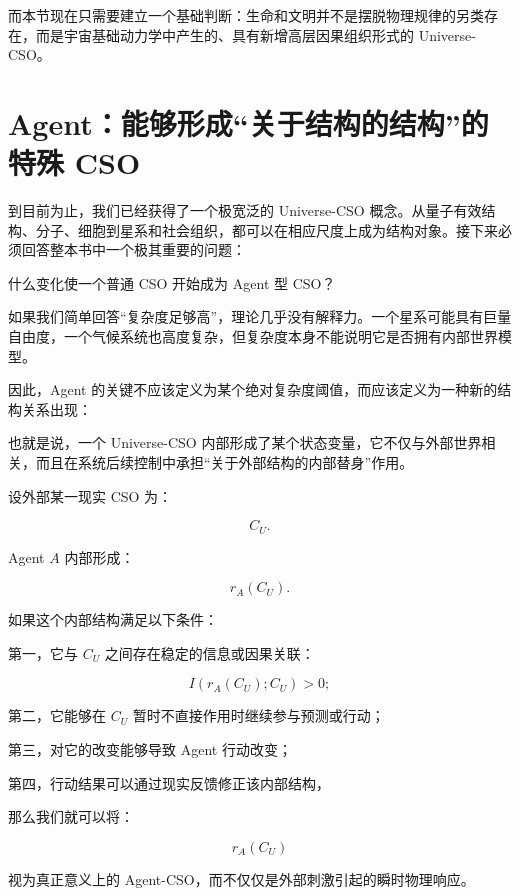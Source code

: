 而本节现在只需要建立一个基础判断：生命和文明并不是摆脱物理规律的另类存在，而是宇宙基础动力学中产生的、具有新增高层因果组织形式的 Universe-CSO。

\section{Agent：能够形成“关于结构的结构”的特殊 CSO}

到目前为止，我们已经获得了一个极宽泛的 Universe-CSO 概念。从量子有效结构、分子、细胞到星系和社会组织，都可以在相应尺度上成为结构对象。接下来必须回答整本书中一个极其重要的问题：

\begin{statementbox}
什么变化使一个普通 CSO 开始成为 Agent 型 CSO？
\end{statementbox}

如果我们简单回答“复杂度足够高”，理论几乎没有解释力。一个星系可能具有巨量自由度，一个气候系统也高度复杂，但复杂度本身不能说明它是否拥有内部世界模型。

因此，Agent 的关键不应该定义为某个绝对复杂度阈值，而应该定义为一种新的结构关系出现：

\begin{statementbox}
\centering
{}
\end{statementbox}

也就是说，一个 Universe-CSO 内部形成了某个状态变量，它不仅与外部世界相关，而且在系统后续控制中承担“关于外部结构的内部替身”作用。

设外部某一现实 CSO 为：

\[
C_U.
\]

Agent $A$ 内部形成：

\[
r_A(C_U).
\]

如果这个内部结构满足以下条件：

第一，它与 $C_U$ 之间存在稳定的信息或因果关联：

\[
I
\left(
r_A(C_U);
C_U
\right)
>
0;
\]

第二，它能够在 $C_U$ 暂时不直接作用时继续参与预测或行动；

第三，对它的改变能够导致 Agent 行动改变；

第四，行动结果可以通过现实反馈修正该内部结构，

那么我们就可以将：

\[
r_A(C_U)
\]

视为真正意义上的 Agent-CSO，而不仅仅是外部刺激引起的瞬时物理响应。

